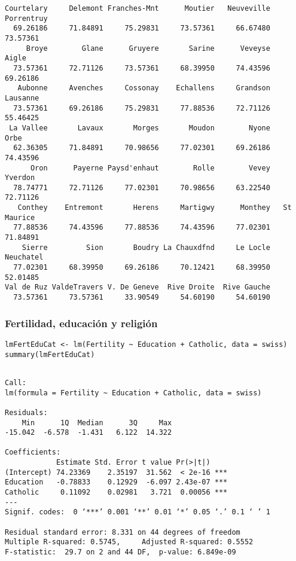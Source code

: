 \documentclass[bigger]{beamer}
\begin{document}
\begin{frame}[fragile]
\begin{verbatim}
Courtelary     Delemont Franches-Mnt      Moutier   Neuveville   Porrentruy 
  69.26186     71.84891     75.29831     73.57361     66.67480     73.57361 
     Broye        Glane      Gruyere       Sarine      Veveyse        Aigle 
  73.57361     72.71126     73.57361     68.39950     74.43596     69.26186 
   Aubonne     Avenches     Cossonay    Echallens     Grandson     Lausanne 
  73.57361     69.26186     75.29831     77.88536     72.71126     55.46425 
 La Vallee       Lavaux       Morges       Moudon        Nyone         Orbe 
  62.36305     71.84891     70.98656     77.02301     69.26186     74.43596 
      Oron      Payerne Paysd'enhaut        Rolle        Vevey      Yverdon 
  78.74771     72.71126     77.02301     70.98656     63.22540     72.71126 
   Conthey    Entremont       Herens     Martigwy      Monthey   St Maurice 
  77.88536     74.43596     77.88536     74.43596     77.02301     71.84891 
    Sierre         Sion       Boudry La Chauxdfnd     Le Locle    Neuchatel 
  77.02301     68.39950     69.26186     70.12421     68.39950     52.01485 
Val de Ruz ValdeTravers V. De Geneve  Rive Droite  Rive Gauche 
  73.57361     73.57361     33.90549     54.60190     54.60190
\end{verbatim}
\end{frame}
\begin{frame}[fragile]
\frametitle{Fertilidad, educación y religión}
\label{sec-3-3}


\lstset{language=R}
\begin{lstlisting}
lmFertEduCat <- lm(Fertility ~ Education + Catholic, data = swiss)
summary(lmFertEduCat)
\end{lstlisting}


\begin{verbatim}

Call:
lm(formula = Fertility ~ Education + Catholic, data = swiss)

Residuals:
    Min      1Q  Median      3Q     Max 
-15.042  -6.578  -1.431   6.122  14.322 

Coefficients:
            Estimate Std. Error t value Pr(>|t|)    
(Intercept) 74.23369    2.35197  31.562  < 2e-16 ***
Education   -0.78833    0.12929  -6.097 2.43e-07 ***
Catholic     0.11092    0.02981   3.721  0.00056 ***
---
Signif. codes:  0 ‘***’ 0.001 ‘**’ 0.01 ‘*’ 0.05 ‘.’ 0.1 ‘ ’ 1 

Residual standard error: 8.331 on 44 degrees of freedom
Multiple R-squared: 0.5745,     Adjusted R-squared: 0.5552 
F-statistic:  29.7 on 2 and 44 DF,  p-value: 6.849e-09
\end{verbatim}
\end{frame}
\end{document}
